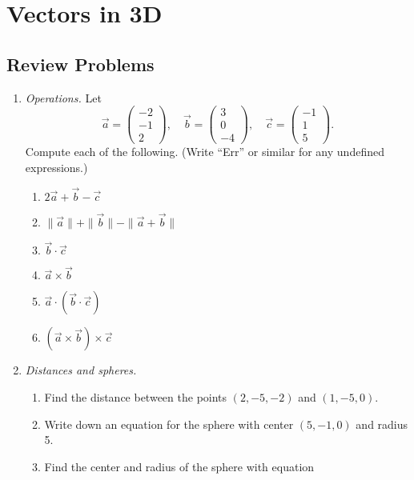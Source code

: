 \section{Vectors in 3D}

\subsection{Review Problems}

\begin{enumerate}
\item \emph{Operations.} Let
\begin{equation*}
\vec{a} = \begin{pmatrix} -2 \\ -1 \\ 2 \end{pmatrix},\quad\vec{b} = \begin{pmatrix} 3 \\ 0 \\ -4 \end{pmatrix},\quad\vec{c} = \begin{pmatrix} -1 \\ 1 \\ 5 \end{pmatrix}.
\end{equation*}
Compute each of the following. (Write ``Err'' or similar for any undefined expressions.)
\begin{multicols}{2}
\begin{enumerate}
\item $2\vec{a} + \vec{b} - \vec{c}$
\item $\|\vec{a}\| + \|\vec{b}\| - \|\vec{a} + \vec{b}\|$
\item $\vec{b}\cdot\vec{c}$
\item $\vec{a}\times\vec{b}$
\item $\vec{a}\cdot (\vec{b}\cdot\vec{c})$
\item $(\vec{a}\times\vec{b})\times\vec{c}$
\end{enumerate}
\end{multicols}
\item \emph{Distances and spheres.} 
\begin{enumerate}
\item Find the distance between the points $(2, -5, -2)$ and $(1, -5, 0)$.
\item Write down an equation for the sphere with center $(5, -1, 0)$ and radius 5.
\item Find the center and radius of the sphere with equation

\end{enumerate}
\end{enumerate}
